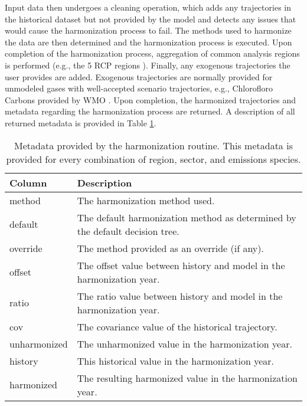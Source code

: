 Input data then undergoes a cleaning operation, which adds any trajectories in
the historical dataset but not provided by the model and detects any issues that
would cause the harmonization process to fail. The methods used to harmonize the
data are then determined and the harmonization process is executed. Upon
completion of the harmonization process, aggregation of common analysis regions
is performed (e.g., the 5 RCP regions ). Finally, any exogenous
trajectories the user provides are added. Exogenous trajectories are normally
provided for unmodeled gases with well-accepted scenario trajectories, e.g.,
Chlorofloro Carbons provided by WMO . Upon completion, the harmonized
trajectories and metadata regarding the harmonization process are returned. A
description of all returned metadata is provided in Table \ref{tab:metadata}.

\begin{table}[]
\centering
\caption{Metadata provided by the  harmonization routine. This metadata is provided for every combination of region, sector, and emissions species.}
\label{tab:metadata}
\begin{tabular}{|p{2cm}|p{8cm}|}
\hline
Column       & Description                                                                  \\
\hline
\hline
method       & The harmonization method used.                                               \\
\hline
default      & The default harmonization method as determined by the default decision tree. \\
\hline
override     & The method provided as an override (if any).                                 \\
\hline
offset       & The offset value between history and model in the harmonization year.        \\
\hline
ratio        & The ratio value between history and model in the harmonization year.         \\
\hline
cov          & The covariance value of the historical trajectory.                           \\
\hline
unharmonized & The unharmonized value in the harmonization year.                            \\
\hline
history      & This historical value in the harmonization year.                             \\
\hline
harmonized   & The resulting harmonized value in the harmonization year.\\
\hline
\end{tabular}
\end{table}



